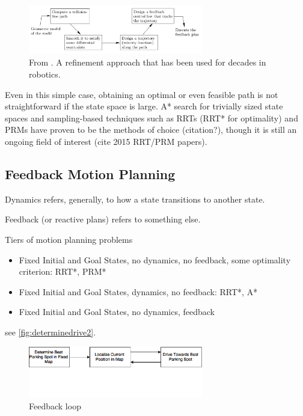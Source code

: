 \begin{figure}
\centering
\includegraphics[width=3in]{figures/lavalle2006planning119.png}
\caption{From \cite{lavalle2006planning}. A refinement approach that has been used for decades in robotics.}
\label{fig:lavalle2006planning119}
\end{figure}

Even in this simple case, obtaining an optimal or even feasible path is not
straightforward if the state space is large. A* search for trivially sized state
spaces and sampling-based techniques such as RRTs (RRT* for optimality) and PRMs
have proven to be the methods of choice (citation?), though it is still an
ongoing field of interest (cite 2015 RRT/PRM papers).

\subsection{Feedback Motion Planning}
Dynamics refers, generally, to how a state transitions to another state.

Feedback (or reactive plans) refers to something else.

Tiers of motion planning problems
\begin{itemize}
\item Fixed Initial and Goal States, no dynamics, no feedback, some optimality
criterion: RRT*, PRM*
\item Fixed Initial and Goal States, dynamics, no feedback: RRT*, A*
\item Fixed Initial and Goal States, no dynamics, feedback
\end{itemize}

see \autoref{fig:determinedrive2}.

\begin{figure} %
\centering
\includegraphics[width=3in]{figures/determinedrive2.png}
\caption{Feedback loop}
\label{fig:determinedrive2}
\end{figure}   %


